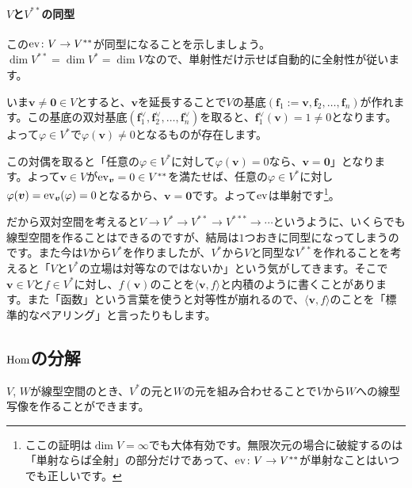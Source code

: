 \paragraph{$V$と$V^{**}$の同型} この$\operatorname{ev}\colon V\rightarrow V^{**}$が同型になることを示しましょう。$\dim V^{**} = \dim V^* = \dim V$なので、単射性だけ示せば自動的に全射性が従います。

いま$\bm{v} \neq \bm{0} \in V$とすると、$\bm{v}$を延長することで$V$の基底$(\bm{f}_1 := \bm{v}, \bm{f}_2, \ldots, \bm{f}_n)$が作れます。この基底の双対基底$(\bm{f}^{\vee}_1, \bm{f}^{\vee}_2, \ldots, \bm{f}^{\vee}_n)$を取ると、$\bm{f}^{\vee}_1(\bm{v}) = 1 \neq 0$となります。よって$\varphi \in V^*$で$\varphi(\bm{v})\neq 0$となるものが存在します。

この対偶を取ると「任意の$\varphi \in V^*$に対して$\varphi(\bm{v}) = 0$なら、$\bm{v} = \bm{0}$」となります。よって$\bm{v} \in V$が$\operatorname{ev}_{\boldsymbol{v}} = 0 \in V^{**}$を満たせば、任意の$\varphi \in V^*$に対し$\varphi(\boldsymbol{v}) = \operatorname{ev}_{\boldsymbol{v}}(\varphi) = 0$となるから、$\bm{v} = \bm{0}$です。よって$\operatorname{ev}$は単射です\footnote{ここの証明は$\dim V = \infty$でも大体有効です。無限次元の場合に破綻するのは「単射ならば全射」の部分だけであって、$\operatorname{ev}\colon V\rightarrow V^{**}$が単射なことはいつでも正しいです。}。

だから双対空間を考えると$V \rightarrow V^* \rightarrow V^{**} \rightarrow V^{***} \rightarrow \cdots$というように、いくらでも線型空間を作ることはできるのですが、結局は$1$つおきに同型になってしまうのです。また今は$V$から$V^*$を作りましたが、$V^{*}$から$V$と同型な$V^{**}$を作れることを考えると「$V$と$V^*$の立場は対等なのではないか」という気がしてきます。そこで$\bm{v} \in V$と$f \in V^*$に対し、$f(\bm{v})$のことを$\langle \bm{v}, f \rangle$と内積のように書くことがあります。また「函数」という言葉を使うと対等性が崩れるので、$\langle \bm{v}, f \rangle$のことを「標準的なペアリング」と言ったりもします。

\subsection{$\operatorname{Hom}$の分解}

$V$, $W$が線型空間のとき、$V^*$の元と$W$の元を組み合わせることで$V$から$W$への線型写像を作ることができます。

